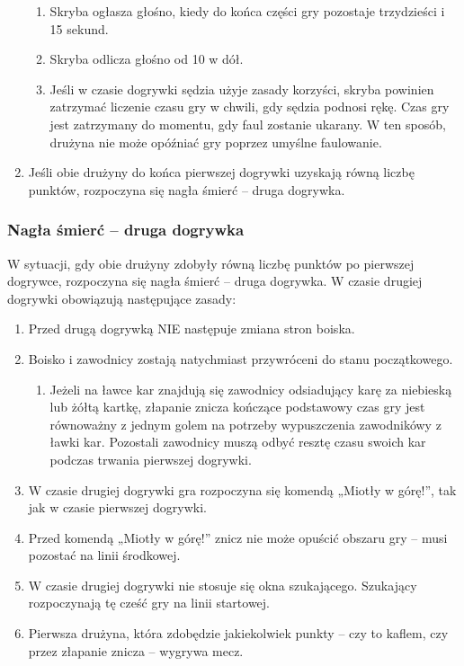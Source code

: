 \documentclass[12pt]{article}
\begin{document}
\begin{enumerate}
\begin{enumerate}
\item Skryba ogłasza głośno, kiedy do końca części gry pozostaje
trzydzieści i 15 sekund.

\item Skryba odlicza głośno od 10 w dół.

\item Jeśli w czasie dogrywki sędzia użyje zasady korzyści, skryba
powinien zatrzymać liczenie czasu gry w chwili, gdy sędzia podnosi rękę.
Czas gry jest zatrzymany do momentu, gdy faul zostanie ukarany. W ten
sposób, drużyna nie może opóźniać gry poprzez umyślne faulowanie.
\end{enumerate}

\item Jeśli obie drużyny do końca pierwszej dogrywki uzyskają równą liczbę
punktów, rozpoczyna się nagła śmierć -- druga dogrywka.
\end{enumerate}

\subsubsection{Nagła śmierć -- druga dogrywka}
W sytuacji, gdy obie
drużyny zdobyły równą liczbę punktów po pierwszej dogrywce, rozpoczyna
się nagła śmierć -- druga dogrywka. W czasie drugiej dogrywki obowiązują
następujące zasady:

\begin{enumerate}
\item Przed drugą dogrywką NIE następuje zmiana stron boiska.

\item Boisko i zawodnicy zostają natychmiast przywróceni do stanu
początkowego.
\begin{enumerate}
\item Jeżeli na ławce kar znajdują się zawodnicy odsiadujący karę za
niebieską lub żółtą kartkę, złapanie znicza kończące podstawowy czas gry
jest równoważny z jednym golem na potrzeby wypuszczenia zawodnikówy z
ławki kar. Pozostali zawodnicy muszą odbyć resztę czasu swoich kar
podczas trwania pierwszej dogrywki.
\end{enumerate}
\item W czasie drugiej dogrywki gra rozpoczyna się komendą „Miotły w
górę!'', tak jak w czasie pierwszej dogrywki.

\item Przed komendą „Miotły w górę!'' znicz nie może opuścić obszaru gry --
musi pozostać na linii środkowej.

\item W czasie drugiej dogrywki nie stosuje się okna szukającego. Szukający
rozpoczynają tę cześć gry na linii startowej.

\item Pierwsza drużyna, która zdobędzie jakiekolwiek punkty -- czy to
kaflem, czy przez złapanie znicza -- wygrywa mecz.
\end{enumerate}
\end{document}
